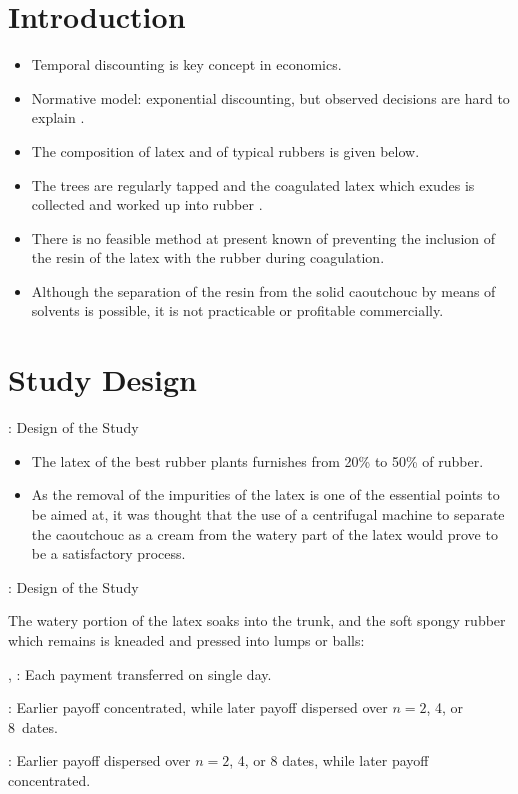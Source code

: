 \section{Introduction}


\begin{frame}{\titleprefix}

	\begin{itemize}
		\item Temporal discounting is key concept in economics.
		\item Normative model: exponential discounting, but observed decisions are hard to explain \citep[e.g.,][]{Dohmen2012}.
		\item The composition of latex and of typical rubbers is given below.
		\item The trees are regularly tapped and the coagulated latex which exudes is collected and worked up into rubber \citep{Koszegi2013}.
		\item There is no feasible method at present known of preventing the inclusion of the resin of the latex with the rubber during coagulation.
		\item Although the separation of the resin from the solid caoutchouc by means of solvents is possible, it is not practicable or profitable commercially.
	\end{itemize}

\end{frame}


\section{Study Design}


\begin{frame}{\titleprefix: Design of the Study}

	\begin{itemize}
		\item The latex of the best rubber plants furnishes from 20\% to 50\% of rubber.
		\item As the removal of the impurities of the latex is one of the essential points to be aimed at, it was thought that the use of a centrifugal machine to separate the caoutchouc as a cream from the watery part of the latex would prove to be a satisfactory process.
	\end{itemize}

\end{frame}


\begin{frame}{\titleprefix: Design of the Study}

	The watery portion of the latex soaks into the trunk, and the soft spongy rubber which remains is kneaded and pressed into lumps or balls:
	
	\alert{\balA, \balB:} Each payment transferred on single day.
	
	\alert{\unbalA:} Earlier payoff concentrated, while later payoff dispersed over ${n = 2}$, 4, or 8~dates.
	
	\alert{\unbalB:} Earlier payoff dispersed over ${n = 2}$, 4, or 8 dates, while later payoff concentrated.

\end{frame}


